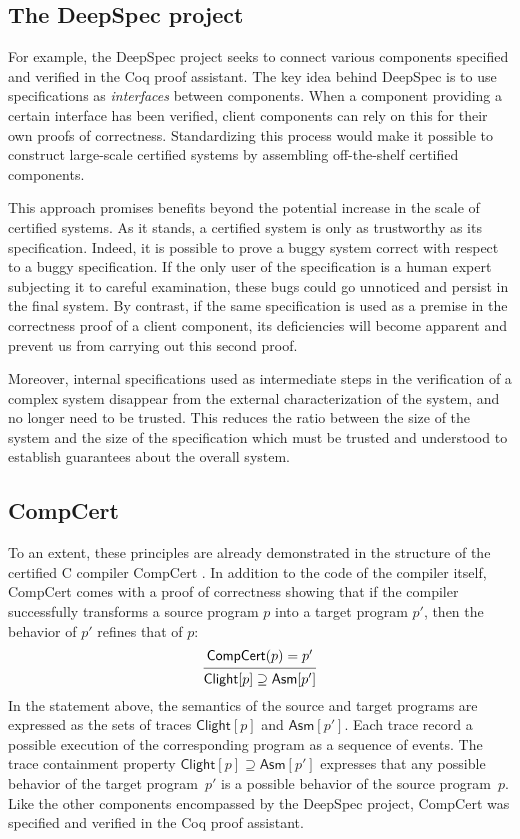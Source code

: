 \documentclass[draft,11pt]{report}
\theoremstyle{definition}
\newcommand{\kw}[1]{\ensuremath{ \mathsf{#1} }}
\begin{document}

\subsection{The DeepSpec project} %

For example, the DeepSpec project \citep{deepspec}
seeks to connect various components
specified and verified in the Coq proof assistant.
The key idea behind DeepSpec
is to use specifications as \emph{interfaces}
between components.
When a component providing a certain interface
has been verified,
client components can rely on this
for their own proofs of correctness.
Standardizing this process would make it possible
to construct large-scale certified systems
by assembling off-the-shelf certified components.

This approach promises benefits
beyond the potential increase in the scale of
certified systems.
As it stands,
a certified system is only
as trustworthy as its specification.
Indeed,
it is possible to prove a buggy system correct
with respect to a buggy specification.
If the only user of the specification
is a human expert subjecting it to careful examination,
these bugs could go unnoticed
and persist in the final system.
By contrast,
if the same specification is used as a premise
in the correctness proof of a client component,
its deficiencies will become apparent
and prevent us from carrying out this second proof.

Moreover,
internal specifications used
as intermediate steps
in the verification of a complex system
disappear from the external characterization of the system,
and no longer need to be trusted.
This reduces the ratio between the size of the system
and the size of the specification
which must be trusted and understood
to establish guarantees about the overall system.


\subsection{CompCert} %

To an extent,
these principles are already demonstrated in the structure of the
certified C compiler CompCert \citep{compcert}.
In addition to the code of the compiler itself,
CompCert comes with a proof of correctness
showing that if the compiler successfully transforms
a source program $p$ into a target program $p'$,
then the behavior of $p'$ refines that of $p$:
\[
  \begin{prooftree}
    \hypo{\kw{CompCert}(p) = p'}
    \infer1{\kw{Clight}[p] \supseteq \kw{Asm}[p']}
  \end{prooftree}
\]
In the statement above,
the semantics of the source and target programs
are expressed as the sets of traces
$\kw{Clight}[p]$ and $\kw{Asm}[p']$.
Each trace record a possible execution of the corresponding program
as a sequence of events.
The trace containment property
$\kw{Clight}[p] \supseteq \kw{Asm}[p']$
expresses that any possible behavior of
the target program~$p'$
is a possible behavior of the source program~$p$.
Like the other components encompassed by the DeepSpec project,
CompCert was specified and verified
in the Coq proof assistant.
\end{document}
